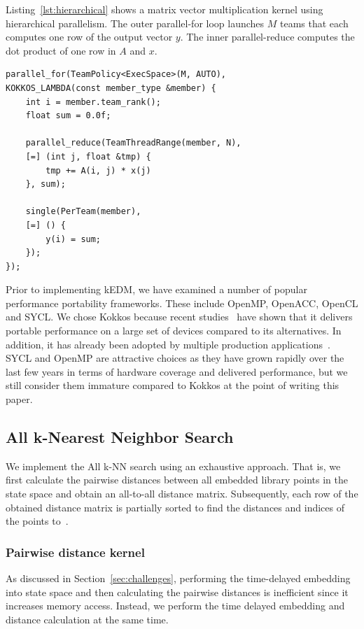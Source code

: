 \documentclass[conference]{IEEEtran}
\begin{document}
Listing~\ref{lst:hierarchical} shows a matrix vector multiplication kernel
using hierarchical parallelism. The outer parallel-for loop launches $M$ teams
that each computes one row of the output vector $y$. The inner parallel-reduce
computes the dot product of one row in $A$ and $x$.

\begin{lstlisting}[caption={Hierarchical data parallel loop},label={lst:hierarchical}]
parallel_for(TeamPolicy<ExecSpace>(M, AUTO),
KOKKOS_LAMBDA(const member_type &member) {
    int i = member.team_rank();
    float sum = 0.0f;

    parallel_reduce(TeamThreadRange(member, N),
    [=] (int j, float &tmp) {
        tmp += A(i, j) * x(j)
    }, sum);

    single(PerTeam(member),
    [=] () {
        y(i) = sum;
    });
});
\end{lstlisting}

Prior to implementing kEDM, we have examined a number of popular performance
portability frameworks. These include OpenMP, OpenACC, OpenCL and SYCL\@. We
chose Kokkos  because recent studies~\cite{Martineau2017, Deakin2019, Deakin2020}
have shown that it delivers portable performance on a large set of devices
compared to its alternatives. In addition, it has already been adopted by
multiple production applications~\cite{Sprague2020,Holmen2017,Demeshko2019}.
SYCL and OpenMP are attractive choices as they have grown rapidly over the
last few years in terms of hardware coverage and delivered performance, but we
still consider them immature compared to Kokkos at the point of writing this
paper.

\subsection{All k-Nearest Neighbor Search}

We implement the All k-NN search using an exhaustive approach. That is, we
first calculate the pairwise distances between all embedded library points in
the state space and obtain an all-to-all distance matrix. Subsequently, each
row of the obtained distance matrix is partially sorted to find the distances
and indices of the points
to~\cite{Garcia2008,Garcia2010}.

\cite{Johnson2019}
\cite{Shanbhag2018}

\subsubsection{Pairwise distance kernel}
As discussed in Section~\ref{sec:challenges}, performing the time-delayed
embedding into state space and then calculating the pairwise distances is
inefficient since it increases memory access. Instead, we perform the time
delayed embedding and distance calculation at the same time.
\end{document}
